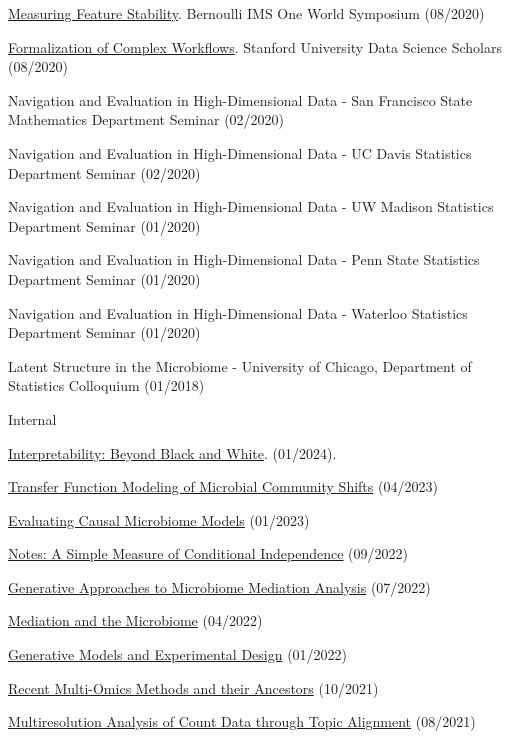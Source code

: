 \documentclass[letterpaper]{article}
\renewenvironment{itemize}{
  \begin{list}{}{
    \setlength{\leftmargin}{1.5em}
  }
}{
  \end{list}
}
\begin{document}
\begin{itemize}
  \item \href{https://www.youtube.com/watch?v=0W84gxCm83A}{Measuring Feature Stability}. Bernoulli IMS One World Symposium (08/2020)
  \item \href{https://drive.google.com/file/d/1mSRbA96aTuiIHSUmgfZKV788seF3X7p_/view?usp=sharing}{Formalization of Complex Workflows}. Stanford University Data Science Scholars (08/2020)
  \item Navigation and Evaluation in High-Dimensional Data - San Francisco State Mathematics Department Seminar (02/2020)
  \item Navigation and Evaluation in High-Dimensional Data - UC Davis Statistics Department Seminar (02/2020)
  \item Navigation and Evaluation in High-Dimensional Data - UW Madison Statistics Department Seminar (01/2020)
  \item Navigation and Evaluation in High-Dimensional Data - Penn State Statistics Department Seminar (01/2020)
  \item Navigation and Evaluation in High-Dimensional Data - Waterloo Statistics Department Seminar (01/2020)
  \item Latent Structure in the Microbiome - University of Chicago, Department of Statistics Colloquium (01/2018)
\end{itemize}

Internal
\begin{itemize}
  \item \href{https://github.com/krisrs1128/talks/blob/master/2024/20240119/20240119.pptx}{Interpretability: Beyond Black and White}. (01/2024).
  \item \href{https://krisrs1128.github.io/talks/2023/20230414/20230414.html}{Transfer Function Modeling of Microbial Community Shifts} (04/2023)
  \item \href{https://krisrs1128.github.io/talks/2023/20230120/20230120.html}{Evaluating Causal Microbiome Models} (01/2023)
  \item \href{https://krisrs1128.github.io/talks/2022/20220930/20220930.html}{Notes: A Simple Measure of Conditional Independence} (09/2022)
  \item \href{https://drive.google.com/file/d/1n6gEubzFuIRRRYxGewY81k1ZdQS24oKg/view}{Generative Approaches to Microbiome Mediation Analysis} (07/2022)
  \item \href{https://drive.google.com/file/d/17xNjMA-pH70wM_gknUnM0A5gr0k87gAo/view}{Mediation and the Microbiome} (04/2022)
  \item \href{https://drive.google.com/file/d/1OMIulBki_0an7Lwd0MKPGH1f0OdK0etH/view}{Generative Models and Experimental Design} (01/2022)
  \item \href{https://drive.google.com/file/d/1L2crRIcdbql__XZdJuiRXkAKsvwrIZLO/view}{Recent Multi-Omics Methods and their Ancestors} (10/2021)
  \item \href{https://drive.google.com/file/d/1VcXF0fAK2IlA3yXeqnJ_1CGC6BP4zPqp/view}{Multiresolution Analysis of Count Data through Topic Alignment} (08/2021)
\end{itemize}
\end{document}
